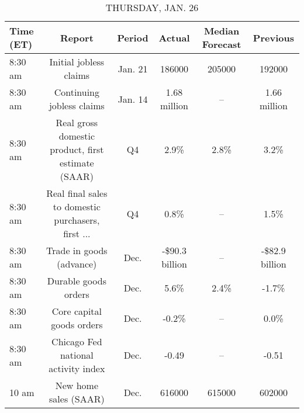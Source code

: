 \documentclass{article}%
\begin{document}
\begin{table}[htbp]%
\caption{THURSDAY, JAN. 26}%
\centering%
\begin{adjustbox}{width=1\textwidth}%
\begin{tabular}{lccccc}
\toprule
Time (ET) &                                             Report &  Period &         Actual & Median Forecast &       Previous \\
\midrule
  8:30 am &                             Initial jobless claims & Jan. 21 &         186000 &          205000 &         192000 \\
  8:30 am &                          Continuing jobless claims & Jan. 14 &   1.68 million &              -- &   1.66 million \\
  8:30 am & Real gross domestic product, first estimate (SAAR) &      Q4 &           2.9\% &            2.8\% &           3.2\% \\
  8:30 am & Real final sales to domestic purchasers, first ... &      Q4 &           0.8\% &              -- &           1.5\% \\
  8:30 am &                           Trade in goods (advance) &    Dec. & -\$90.3 billion &              -- & -\$82.9 billion \\
  8:30 am &                               Durable goods orders &    Dec. &           5.6\% &            2.4\% &          -1.7\% \\
  8:30 am &                          Core capital goods orders &    Dec. &          -0.2\% &              -- &           0.0\% \\
  8:30 am &                Chicago Fed national activity index &    Dec. &          -0.49 &              -- &          -0.51 \\
    10 am &                              New home sales (SAAR) &    Dec. &         616000 &          615000 &         602000 \\
\bottomrule
\end{tabular}
%
\end{adjustbox}%
\end{table}

%
\end{document}
